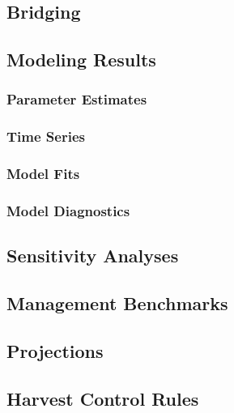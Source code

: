 \documentclass[
]{scrartcl}
\begin{document}
\subsection{Bridging}\label{bridging}

\newpage{}

\subsection{Modeling Results}\label{sec-assmt-results}

\subsubsection{Parameter Estimates}\label{parameter-estimates}

\subsubsection{Time Series}\label{time-series}

\subsubsection{Model Fits}\label{model-fits}

\subsubsection{Model Diagnostics}\label{model-diagnostics}

\newpage{}

\subsection{Sensitivity Analyses}\label{sec-assmt-sens}

\newpage{}

\subsection{Management Benchmarks}\label{sec-assmt-bench}

\newpage{}

\subsection{Projections}\label{sec-assmt-proj}

\newpage{}

\subsection{Harvest Control Rules}\label{harvest-control-rules}
\end{document}
